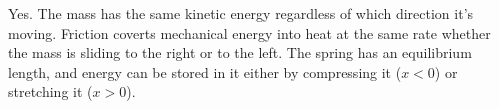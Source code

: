 Yes. The mass has the same kinetic energy regardless of which
direction it's moving. Friction coverts mechanical energy into heat
at the same rate whether the mass is sliding to the right or to the
left. The spring has an equilibrium length, and energy can be stored
in it either by compressing it ($x<0$) or stretching it ($x>0$).



